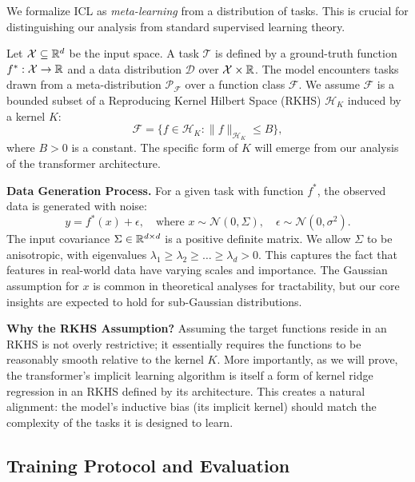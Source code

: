 We formalize ICL as \textit{meta-learning} from a distribution of tasks. This is crucial for distinguishing our analysis from standard supervised learning theory.

\begin{definition}
	Let \( \mathcal{X} \subseteq \mathbb{R}^d \) be the input space. A task \( \mathcal{T} \) is defined by a ground-truth function \( f^*: \mathcal{X} \to \mathbb{R} \) and a data distribution \( \mathcal{D} \) over \( \mathcal{X} \times \mathbb{R} \). The model encounters tasks drawn from a meta-distribution \( \mathcal{P}_{\mathcal{F}} \) over a function class \( \mathcal{F} \). We assume \( \mathcal{F} \) is a bounded subset of a Reproducing Kernel Hilbert Space (RKHS) \( \mathcal{H}_K \) induced by a kernel \( K \):
	\[
	\mathcal{F} = \{ f \in \mathcal{H}_K : \|f\|_{\mathcal{H}_K} \leq B \},
	\]
	where \( B > 0 \) is a constant. The specific form of \( K \) will emerge from our analysis of the transformer architecture.
\end{definition}

\noindent \textbf{Data Generation Process.} For a given task with function \( f^* \), the observed data is generated with noise:
\begin{equation}
	y = f^*(x) + \epsilon, \quad \text{where } x \sim \mathcal{N}(0, \Sigma), \quad \epsilon \sim \mathcal{N}(0, \sigma^2).
	\label{eq:data_gen}
\end{equation}
The input covariance \( \Sigma \in \mathbb{R}^{d \times d} \) is a positive definite matrix. We allow \( \Sigma \) to be anisotropic, with eigenvalues \( \lambda_1 \geq \lambda_2 \geq \dots \geq \lambda_d > 0 \). This captures the fact that features in real-world data have varying scales and importance. The Gaussian assumption for \( x \) is common in theoretical analyses for tractability, but our core insights are expected to hold for sub-Gaussian distributions.

\textbf{Why the RKHS Assumption?} Assuming the target functions reside in an RKHS is not overly restrictive; it essentially requires the functions to be reasonably smooth relative to the kernel \( K \). More importantly, as we will prove, the transformer's implicit learning algorithm is itself a form of kernel ridge regression in an RKHS defined by its architecture. This creates a natural alignment: the model's inductive bias (its implicit kernel) should match the complexity of the tasks it is designed to learn.

\subsection{Training Protocol and Evaluation}
\label{subsec:protocol}

